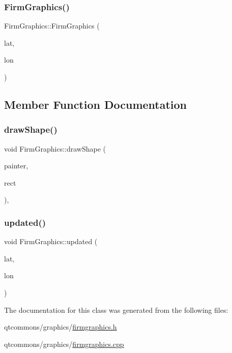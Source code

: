 \subsubsection{\texorpdfstring{FirmGraphics()}{FirmGraphics()}}
{\footnotesize\ttfamily Firm\+Graphics\+::\+Firm\+Graphics (\begin{DoxyParamCaption}\item[{float}]{lat,  }\item[{float}]{lon }\end{DoxyParamCaption})}



\subsection{Member Function Documentation}
\mbox{\label{class_firm_graphics_a79ed249801cc7997486bc024684ce014}} 
\subsubsection{\texorpdfstring{drawShape()}{drawShape()}}
{\footnotesize\ttfamily void Firm\+Graphics\+::draw\+Shape (\begin{DoxyParamCaption}\item[{Q\+Painter \&}]{painter,  }\item[{const qmapcontrol\+::\+Rect\+World\+Px \&}]{rect }\end{DoxyParamCaption})\hspace{0.3cm}{\ttfamily [protected]}, {\ttfamily [virtual]}}

\mbox{\label{class_firm_graphics_a64e35abd5ff32589fa3fa0b88c55cbaa}} 
\subsubsection{\texorpdfstring{updated()}{updated()}}
{\footnotesize\ttfamily void Firm\+Graphics\+::updated (\begin{DoxyParamCaption}\item[{float}]{lat,  }\item[{float}]{lon }\end{DoxyParamCaption})}



The documentation for this class was generated from the following files\+:\begin{DoxyCompactItemize}
\item 
qtcommons/graphics/\mbox{\hyperlink{firmgraphics_8h}{firmgraphics.\+h}}\item 
qtcommons/graphics/\mbox{\hyperlink{firmgraphics_8cpp}{firmgraphics.\+cpp}}\end{DoxyCompactItemize}
